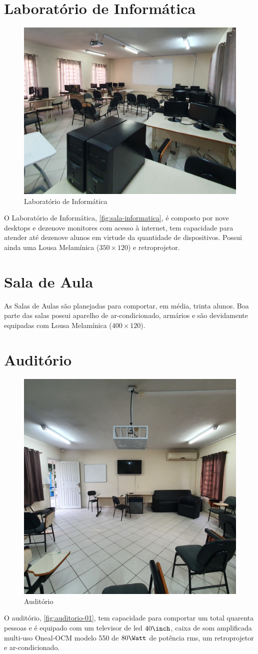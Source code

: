 \section{Laboratório de Informática} %
\label{sec:Laboratório de Informática}
\setlength\intextsep{0pt}
\begin{figure}
	\centering
	\includegraphics[width=.4\textwidth]{assets/sala-de-informatica02.jpg}
	\caption{Laboratório de Informática}
	\label{fig:sala-informatica}
\end{figure}
O Laboratório de Informática, \autoref{fig:sala-informatica}, é composto por nove desktops e dezenove monitores com acesso à internet, tem capacidade para atender até dezenove alunos em virtude da quantidade de dispositivos. Possui ainda uma Lousa Melamínica ($350\times 120$)\cm\; e retroprojetor.

\section{Sala de Aula} %
\label{sec:Sala de Aula}
As Salas de Aulas são planejadas para comportar, em média, trinta alunos. Boa parte das salas possui aparelho de ar-condicionado, armários e são devidamente equipadas com Lousa Melamínica ($400\times 120$)\cm.

\section{Auditório} %
\label{sec:Auditório}
\setlength\intextsep{0pt}
\begin{figure}
	\centering
	\includegraphics[width=.45\textwidth]{assets/auditorio-01.jpg}
	\caption{Auditório}
	\label{fig:auditorio-01}
\end{figure}
O auditório, \autoref{fig:auditorio-01}, tem capacidade para comportar um total quarenta pessoas e é equipado com um televisor de led $40\inch$, caixa de som amplificada multi-uso Oneal-OCM modelo 550 de $80\Watt$ de potência rms, um retroprojetor e ar-condicionado.

